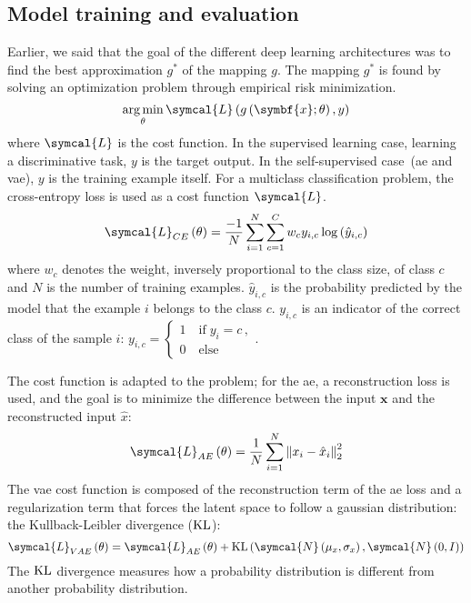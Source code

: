\documentclass[../main.tex]{subfiles}
\begin{document}
	\subsection{Model training and evaluation}
		Earlier, we said that the goal of the different deep learning architectures was to find the best approximation \(g^{*}\) of the mapping \(g\).
		The mapping \(g^{*}\) is found by solving an optimization problem through empirical risk minimization.
		\begin{equation}
			\argmin_{\theta} \symcal{L}\left(g\left(\symbf{x}; \theta\right), y\right) \label{eq:dl_opt}
		\end{equation}
		where \(\symcal{L}\) is the cost function.
		In the supervised learning case, learning a discriminative task, \(y\) is the target output.
		In the self-supervised case~(\gls{ae} and \gls{vae}), \(y\) is the training example itself.
		For a multiclass classification problem, the cross-entropy loss is used as a cost function \(\symcal{L}\).
		\begin{equation}
			\symcal{L}_{CE}\left(\theta\right) = \frac{-1}{N}\sum_{i=1}^{N}\sum_{c=1}^{C} w_c y_{i,c}\log\left(\hat{y}_{i,c}\right)
		\end{equation}
		where \(w_c\) denotes the weight, inversely proportional to the class size, of class \(c\) and \(N\) is the number of training examples.
		\(\hat{y}_{i,c}\) is the probability predicted by the model that the example \(i\) belongs to the class \(c\).
		\(y_{i,c}\) is an indicator of the correct class of the sample \(i\):
		\(
		y_{i,c} = \begin{cases}
			1 \quad \text{if}\; y_i = c \, , \\
			0 \quad \text{else}
		\end{cases}
		\).

		The cost function is adapted to the problem; for the \gls{ae}, a reconstruction loss is used, and the goal is to minimize the difference between the input \(\symbf{x}\) and the reconstructed input \(\hat{x}\):
		\begin{equation}
			\symcal{L}_{AE}\left(\theta\right) = \frac{1}{N}\sum_{i=1}^{N} {\left\|x_i - \hat{x}_i \right\|}_2^{2} \label{eq:loss_ae}
		\end{equation}
		The \gls{vae} cost function is composed of the reconstruction term of the \gls{ae} loss and a regularization term that forces the latent space to follow a gaussian distribution: the Kullback-Leibler divergence (\(\operatorname{KL}\)):
		\begin{equation}
			\symcal{L}_{VAE}\left(\theta\right) = \symcal{L}_{AE}\left(\theta\right) + \KL\left(\symcal{N}\left(\mu_{x}, \sigma_{x}\right), \symcal{N}\left(0, I\right)\right)
		\end{equation}
		The \(\operatorname{KL}\) divergence measures how a probability distribution is different from another probability distribution.
\end{document}
